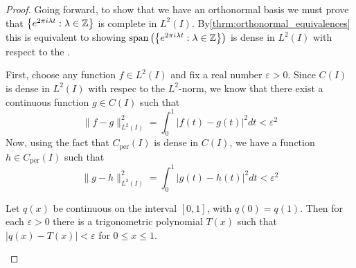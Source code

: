 \documentclass[../thesis.tex]{subfiles}
\begin{document}
\begin{proof}
    Going forward, to show that we have an orthonormal basis we must prove that $\left\{e^{2\pi i \lambda t } : \lambda \in \mathbb{Z}\right\}$ is complete in $L^2(I)$. By\cref{thrm:orthonormal_equivalences} this is equivalent to showing $\operatorname{span}\left( \left\{e^{2\pi i \lambda t } : \lambda \in \mathbb{Z}\right\} \right)$ is dense in $L^2(I)$ with respect to the \Ltwonorm. 

    First, choose any function $f\in L^2(I)$ and fix a real number $\varepsilon >0$. Since $C(I)$ is dense in $L^2(I)$ with respec to the $L^2$-norm, we know that there exist a continuous function $g \in C(I)$ such that
    \begin{equation}
        \| f-g \|_{L^2(I)}^2 = \int_0^1 \left|f(t)-g(t) \right|^2dt < \varepsilon^2
    \end{equation}
    Now, using the fact that $C_{\text{per}}(I)$ is dense in $C(I)$, we have a function $h\in C_{\text{per}}(I)$ such that 
    \begin{equation}
        \| g-h \|_{L^2(I)}^2 = \int_0^1 \left|g(t)-h(t) \right|^2dt < \varepsilon^2
    \end{equation}

    \begin{theorem}\label{thrm:weierstrassApprox}
        Let $q(x)$ be continuous on the interval $[0, 1]$, with $q(0)=q(1)$. Then for each $\varepsilon>0$ there is a trigonometric polynomial $T(x)$ such that $|q(x)-T(x)|<\varepsilon$ for $0 \leq x \leq 1$.
    \end{theorem}


\end{proof}
\end{document}

